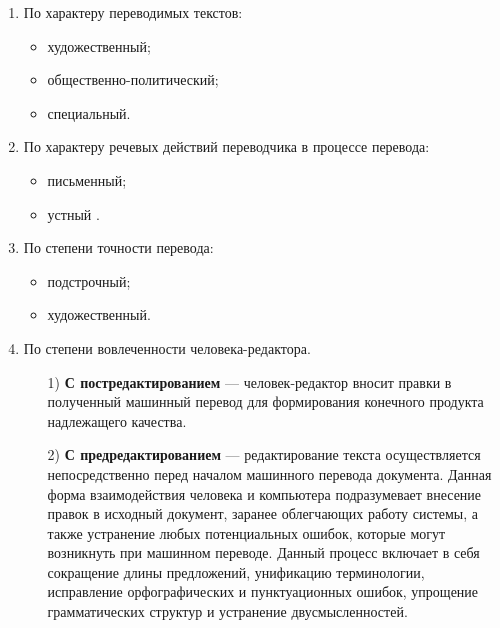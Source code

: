 \begin{enumerate}
	
    \item По характеру переводимых текстов:

        \begin{itemize}[label=---]
        \item художественный;
        \item общественно-политический;
        \item специальный.
    \end{itemize}
    
    \item По характеру речевых действий переводчика в процессе перевода: 

    \begin{itemize}[label=---]
        \item письменный;
        \item устный \cite{valeeva}.
    \end{itemize}

    \item По степени точности перевода: 
    
    \begin{itemize}[label=---]
        \item подстрочный;
        \item художественный.
    \end{itemize}

\item По степени вовлеченности человека-редактора.

\begin{itemize}
	
    \item[1)] \textbf{С постредактированием} --- человек-редактор вносит правки в полученный машинный перевод для формирования конечного продукта надлежащего качества.
    
    \item[2)] \textbf{С предредактированием } --- редактирование текста осуществляется непосредственно перед началом машинного перевода документа.
    Данная форма взаимодействия человека и компьютера подразумевает внесение правок в исходный документ, заранее облегчающих работу системы, а также устранение любых потенциальных ошибок, которые могут возникнуть при машинном переводе.
    Данный процесс включает в себя сокращение длины предложений, унификацию терминологии, исправление орфографических и пунктуационных ошибок, упрощение грамматических структур и устранение двусмысленностей.


\end{itemize}
\end{enumerate}
